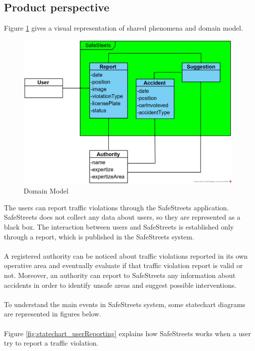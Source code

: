 \documentclass{article}
\begin{document}
		\subsection{Product perspective}
			Figure \ref{fig:domain_model} gives a visual representation of shared phenomena and domain model. 
			\begin{figure}[ht]
				\centering
				\includegraphics {diagrams/domain_model.png}
				\caption[Domain Model]{Domain Model}
				\label{fig:domain_model}
			\end{figure}
			
			The users can report traffic violations through the SafeStreets application.
			SafeStreets does not collect any data about users, so they are represented as a black box. The interaction between users and SafeStreets is established only through a report, which is published in the SafeStreets system.\\\\
			A registered authority can be noticed about traffic violations reported in its own operative area and eventually evaluate if that traffic violation report is valid or not. Moreover, an authority can report to SafeStreets any information about accidents in order to identify unsafe areas and suggest possible interventions.\\\\
			To understand the main events in SafeStreets system, some statechart diagrams are represented in figures below. \\\\
			\clearpage
			Figure \ref{fig:statechart_userReporting} explains how SafeStreets works when a user try to report a traffic violation.
			
\end{document}
